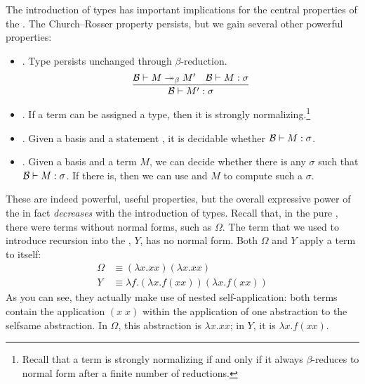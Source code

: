 The introduction of types has important implications for the central properties of the \lambdacalc{}. The Church--Rosser property persists, but we gain several other powerful properties:
\begin{itemize}
\item {}. Type persists unchanged through $\beta$-re\-duc\-tion.
\[
\frac{\basis \turnstile M \betared[*] M\prime \quad \basis \turnstile \stmt{M}{\sigma}}%
{\basis \turnstile \stmt{M\prime}{\sigma}}
\]

\item {}. If a term can be assigned a type, then it is strongly normalizing.\footnote{Recall that a term is strongly normalizing if and only if it always $\beta$-reduces to normal form after a finite number of reductions.}

\item {}. Given a basis \basis{} and a statement , it is decidable whether $\basis \turnstile \stmt{M}{\sigma}$.

\item {}. Given a basis \basis{} and a term $M$, we can decide whether there is any $\sigma$ such that $\basis \turnstile \stmt{M}{\sigma}$. If there is, then we can use \basis{} and $M$ to compute such a $\sigma$.
\end{itemize}

These are indeed powerful, useful properties, but the overall expressive power of the \lambdacalc in fact \emph{decreases} with the introduction of types. Recall that, in the pure \lambdacalc{}, there were terms without normal forms, such as $\Omega$. The term that we used to introduce recursion into the \lambdacalc{}, $Y$, has no normal form. Both $\Omega$ and $Y$ apply a term to itself:
\begin{align*}
\Omega &\equiv (\lambda x.xx)(\lambda x.xx)\\
Y &\equiv \lambda f.(\lambda x. f (x x))(\lambda x. f (x x))
\end{align*}
As you can see, they actually make use of nested self-ap\-pli\-ca\-tion: both terms contain the application $(x\; x)$ within the application of one abstraction to the selfsame abstraction. In $\Omega$, this abstraction is $\lambda x. xx$; in $Y$, it is $\lambda x. f (x x)$.

